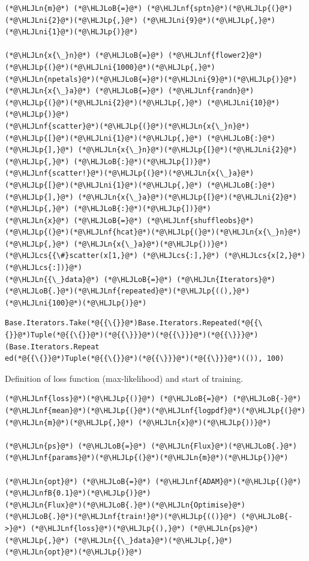 \documentclass[12pt,a4paper]{article}
\newcommand{\HLJLn}[1]{#1}
\newcommand{\HLJLnf}[1]{\textcolor[RGB]{66,102,213}{#1}}
\newcommand{\HLJLnfB}[1]{\textcolor[RGB]{59,151,46}{#1}}
\newcommand{\HLJLni}[1]{\textcolor[RGB]{59,151,46}{#1}}
\newcommand{\HLJLoB}[1]{\textcolor[RGB]{102,102,102}{\textbf{#1}}}
\newcommand{\HLJLp}[1]{#1}
\newcommand{\HLJLcs}[1]{\textcolor[RGB]{153,153,119}{\textit{#1}}}
\begin{document}
\begin{lstlisting}
(*@\HLJLn{m}@*) (*@\HLJLoB{=}@*) (*@\HLJLnf{sptn}@*)(*@\HLJLp{(}@*)(*@\HLJLni{2}@*)(*@\HLJLp{,}@*) (*@\HLJLni{9}@*)(*@\HLJLp{,}@*) (*@\HLJLni{1}@*)(*@\HLJLp{)}@*)

(*@\HLJLn{x{\_}n}@*) (*@\HLJLoB{=}@*) (*@\HLJLnf{flower2}@*)(*@\HLJLp{(}@*)(*@\HLJLni{1000}@*)(*@\HLJLp{,}@*) (*@\HLJLn{npetals}@*)(*@\HLJLoB{=}@*)(*@\HLJLni{9}@*)(*@\HLJLp{)}@*)
(*@\HLJLn{x{\_}a}@*) (*@\HLJLoB{=}@*) (*@\HLJLnf{randn}@*)(*@\HLJLp{(}@*)(*@\HLJLni{2}@*)(*@\HLJLp{,}@*) (*@\HLJLni{10}@*)(*@\HLJLp{)}@*)
(*@\HLJLnf{scatter}@*)(*@\HLJLp{(}@*)(*@\HLJLn{x{\_}n}@*)(*@\HLJLp{[}@*)(*@\HLJLni{1}@*)(*@\HLJLp{,}@*) (*@\HLJLoB{:}@*)(*@\HLJLp{],}@*) (*@\HLJLn{x{\_}n}@*)(*@\HLJLp{[}@*)(*@\HLJLni{2}@*)(*@\HLJLp{,}@*) (*@\HLJLoB{:}@*)(*@\HLJLp{])}@*)
(*@\HLJLnf{scatter!}@*)(*@\HLJLp{(}@*)(*@\HLJLn{x{\_}a}@*)(*@\HLJLp{[}@*)(*@\HLJLni{1}@*)(*@\HLJLp{,}@*) (*@\HLJLoB{:}@*)(*@\HLJLp{],}@*) (*@\HLJLn{x{\_}a}@*)(*@\HLJLp{[}@*)(*@\HLJLni{2}@*)(*@\HLJLp{,}@*) (*@\HLJLoB{:}@*)(*@\HLJLp{])}@*)
(*@\HLJLn{x}@*) (*@\HLJLoB{=}@*) (*@\HLJLnf{shuffleobs}@*)(*@\HLJLp{(}@*)(*@\HLJLnf{hcat}@*)(*@\HLJLp{(}@*)(*@\HLJLn{x{\_}n}@*)(*@\HLJLp{,}@*) (*@\HLJLn{x{\_}a}@*)(*@\HLJLp{))}@*)
(*@\HLJLcs{{\#}scatter(x[1,}@*) (*@\HLJLcs{:],}@*) (*@\HLJLcs{x[2,}@*) (*@\HLJLcs{:])}@*)
(*@\HLJLn{{\_}data}@*) (*@\HLJLoB{=}@*) (*@\HLJLn{Iterators}@*)(*@\HLJLoB{.}@*)(*@\HLJLnf{repeated}@*)(*@\HLJLp{((),}@*) (*@\HLJLni{100}@*)(*@\HLJLp{)}@*)
\end{lstlisting}

\begin{lstlisting}
Base.Iterators.Take(*@{{\{}}@*)Base.Iterators.Repeated(*@{{\{}}@*)Tuple(*@{{\{}}@*)(*@{{\}}}@*)(*@{{\}}}@*)(*@{{\}}}@*)(Base.Iterators.Repeat
ed(*@{{\{}}@*)Tuple(*@{{\{}}@*)(*@{{\}}}@*)(*@{{\}}}@*)(()), 100)
\end{lstlisting}


Definition of loss function (max-likelihood) and start of training.


\begin{lstlisting}
(*@\HLJLnf{loss}@*)(*@\HLJLp{()}@*) (*@\HLJLoB{=}@*) (*@\HLJLoB{-}@*)(*@\HLJLnf{mean}@*)(*@\HLJLp{(}@*)(*@\HLJLnf{logpdf}@*)(*@\HLJLp{(}@*)(*@\HLJLn{m}@*)(*@\HLJLp{,}@*) (*@\HLJLn{x}@*)(*@\HLJLp{))}@*)

(*@\HLJLn{ps}@*) (*@\HLJLoB{=}@*) (*@\HLJLn{Flux}@*)(*@\HLJLoB{.}@*)(*@\HLJLnf{params}@*)(*@\HLJLp{(}@*)(*@\HLJLn{m}@*)(*@\HLJLp{)}@*)

(*@\HLJLn{opt}@*) (*@\HLJLoB{=}@*) (*@\HLJLnf{ADAM}@*)(*@\HLJLp{(}@*)(*@\HLJLnfB{0.1}@*)(*@\HLJLp{)}@*)
(*@\HLJLn{Flux}@*)(*@\HLJLoB{.}@*)(*@\HLJLn{Optimise}@*)(*@\HLJLoB{.}@*)(*@\HLJLnf{train!}@*)(*@\HLJLp{(()}@*) (*@\HLJLoB{->}@*) (*@\HLJLnf{loss}@*)(*@\HLJLp{(),}@*) (*@\HLJLn{ps}@*)(*@\HLJLp{,}@*) (*@\HLJLn{{\_}data}@*)(*@\HLJLp{,}@*) (*@\HLJLn{opt}@*)(*@\HLJLp{)}@*)
\end{lstlisting}
\end{document}
